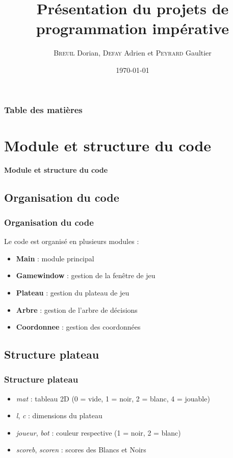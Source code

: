 \documentclass[9pt]{beamer}
\title{Présentation du projets de programmation impérative}
\author{\textsc{Breuil} Dorian, \textsc{Defay} Adrien et \textsc{Peyrard} Gaultier}
\date{\today}
\begin{document}
\frame{\titlepage}  %

\begin{frame}
  \frametitle{Table des matières}
  \tableofcontents
  
\end{frame}

\section{Module et structure du code}
\begin{frame}
  \begin{center}
      \Large \textbf{Module et structure du code}
  \end{center}
\end{frame}

\begin{frame}
  \subsection{Organisation du code}
  \frametitle{Organisation du code}
  Le code est organisé en plusieurs modules :
  \begin{itemize}
  \item \textbf{Main} : module principal
  \item \textbf{Gamewindow} : gestion de la fenêtre de jeu
  \item \textbf{Plateau} : gestion du plateau de jeu
  \item \textbf{Arbre} : gestion de l’arbre de décisions
  \item \textbf{Coordonnee} : gestion des coordonnées
  \end{itemize}
\end{frame}

\subsection{Structure plateau}
\begin{frame}
  \frametitle{Structure plateau}
  \begin{itemize}
    \item \textit{mat} : tableau 2D (0 = vide, 1 = noir, 2 = blanc, 4 = jouable)
    \item \textit{l}, \textit{c} : dimensions du plateau
    \item \textit{joueur}, \textit{bot} : couleur respective (1 = noir, 2 = blanc)
    \item \textit{scoreb}, \textit{scoren} : scores des Blancs et Noirs
  \end{itemize}
\end{frame}
\end{document}
